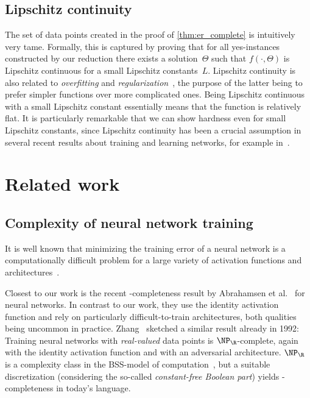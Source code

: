
\subsection{Lipschitz continuity}
The set of data points created in the proof of \cref{thm:er_complete} is intuitively very tame.
Formally, this is captured by proving that for all yes-instances constructed by our reduction there exists a solution~$\Theta$ such that $f(\cdot, \Theta)$ is Lipschitz continuous for a small Lipschitz %
constants~$L$.  %
Lipschitz continuity is also related to \emph{overfitting} and \emph{regularization}~\cite{Gouk2021_Regularisation}, the purpose of the latter being to prefer simpler functions over more complicated ones.
Being Lipschitz continuous with a small Lipschitz constant
essentially means that the function is relatively flat.
It is particularly remarkable that we can show hardness even for small Lipschitz constants, since Lipschitz continuity has been a crucial assumption in several recent results about training and learning \ReLU networks, for example in~\cite{Bienstock2023_LinearProgramming, Chen2022_LearningFTP, Goel2017_ReliablyLearning, bubeck2023universal}.
%


\section{Related work}
\label{sec:related_work}

\subsection{Complexity of neural network training}
It is %
well known  %
that minimizing the training error of a neural network is a computationally difficult problem for a large variety of activation functions and architectures~\cite{Shalev2014_UnderstandingML}.

Closest to our work is the recent \ER-completeness result by Abrahamsen et al.~\cite{Abrahamsen2021_NeuralNetworks} for \twolayer neural networks.
In contrast to our work, they use the identity activation function and rely on particularly
%
difficult-to-train  %
architectures, both qualities being uncommon in practice.
Zhang~\cite{Zhang1992_BSS} sketched a similar result already in 1992:
Training neural networks with \emph{real-valued} data points is $\NP_\R$-complete, again with the identity activation function and with an adversarial architecture.
$\NP_\R$ is a complexity class in the BSS-model of computation~\cite{Blum1989_ComputationOverTheReals}, but a suitable discretization (considering the so-called \emph{constant-free Boolean part}) yields \ER-completeness in today's language.

